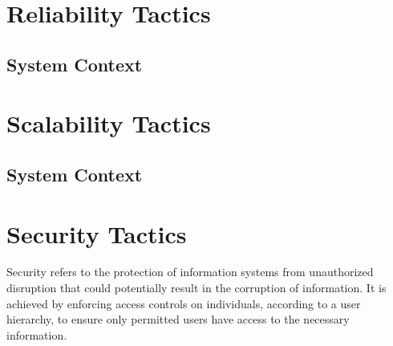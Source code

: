 \documentclass[11pt,fleqn]{book} %
\begin{document}
	\section{Reliability Tactics}
	\subsection{System Context}
	\section{Scalability Tactics}
	\subsection{System Context}
	\section{Security Tactics}
	Security refers to the protection of information systems from unauthorized disruption that could potentially result in the corruption of information. It is achieved by enforcing access controls on individuals, according to a user hierarchy, to ensure only permitted users have access to the necessary information.
\end{document}
